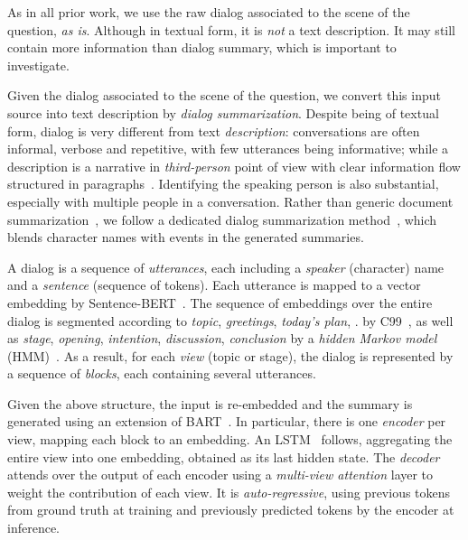 \documentclass[10pt,twocolumn,letterpaper]{article}
\makeatletter
\renewcommand\paragraph{\@startsection{paragraph}{4}{\z@}{1ex}{-1em}{\normalfont\normalsize\bfseries}}
\makeatother
\begin{document}
As in all prior work, we use the raw dialog associated to the scene of the question, \emph{as is}. Although in textual form, it is \emph{not} a text description. It may still contain more information than dialog summary, which is important to investigate.



\paragraph{\up[\sceneSum]}

Given the dialog associated to the scene of the question, we convert this input source into text description by \emph{dialog summarization}. Despite being of textual form, dialog is very different from text \emph{description}: conversations are often informal, verbose and repetitive, with few utterances being informative; while a description is a narrative in \emph{third-person} point of view with clear information flow structured in paragraphs~\cite{chen2020multi}. Identifying the speaking person is also substantial, especially with multiple people in a conversation. Rather than generic document summarization~\cite{gliwa2019samsum}, we follow a dedicated dialog summarization method~\cite{chen2020multi}, which blends character names with events in the generated summaries.

A dialog is a sequence of \emph{utterances}, each including a \emph{speaker} (character) name and a \emph{sentence} (sequence of tokens). Each utterance is mapped to a vector embedding by Sentence-BERT~\cite{reimers-gurevych-2019-sentence}. The sequence of embeddings over the entire dialog is segmented according to  \emph{topic}, \eg \emph{greetings}, \emph{today's plan}, \etc. by C99~\cite{C99-choi-2000-advances}, as well as \emph{stage}, \eg \emph{opening}, \emph{intention}, \emph{discussion}, \emph{conclusion} by a \emph{hidden Markov model} (HMM)~\cite{althoff2016large}. As a result, for each \emph{view} (topic or stage), the dialog is represented by a sequence of \emph{blocks}, each containing several utterances.

Given the above structure, the input is re-embedded and the summary is generated using an extension of BART~\cite{lewis2020bart}. In particular, there is one \emph{encoder} per view, mapping each block to an embedding. An LSTM~\cite{hochreiter1997long} follows, aggregating the entire view into one embedding, obtained as its last hidden state. The \emph{decoder} attends over the output of each encoder using a \emph{multi-view attention} layer to weight the contribution of each view. It is \emph{auto-regressive}, using previous tokens from ground truth at training and previously predicted tokens by the encoder at inference.
\end{document}
